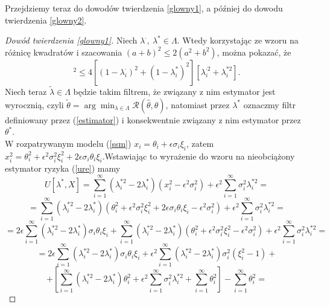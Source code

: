 \documentclass{mwart}
\begin{document}
Przejdziemy teraz do dowodów twierdzenia \ref{glowny1}, a później do dowodu twierdzenia \ref{glowny2}.
\begin{proof}[Dowód twierdzenia \ref{glowny1}]
Niech $\lambda^{\cdot},\ \lambda^*\in \Lambda$. Wtedy korzystając ze wzoru na różnicę kwadratów i szacowania $(a+b)^2\leq 2(a^2+b^2)$, można pokazać, że
\begin{displaymath}
[(1-\lambda_i^{\cdot})^2-(1-\lambda_i^*)^2]^2\leq 4[(1-\lambda_i^{\cdot})^2+(1-\lambda_i^*)^2][\lambda_i^{\cdot 2}+\lambda_i^{*2}].
\end{displaymath}
Niech teraz $\tilde{\lambda}\in \Lambda$ będzie takim filtrem, że związany z nim estymator jest wyrocznią, czyli $\tilde{\theta}=\arg \min_{\lambda\in \Lambda}\mathcal{R}(\hat{\theta},\theta)$, natomiast przez $\lambda^*$ oznaczmy filtr definiowany przez (\ref{estimator}) i konsekwentnie związany z nim estymator przez $\theta^*$.\\
W rozpatrywanym modelu (\ref{ssm}) $x_i=\theta_i+\epsilon\sigma_i\xi_i$, zatem $x_i^2=\theta_i^2+\epsilon^2\sigma_i^2\xi_i^2+2\epsilon\sigma_i\theta_i\xi_i$.Wstawiając to wyrażenie do wzoru na nieobciążony estymator ryzyka (\ref{ure}) mamy
\begin{displaymath}
U[\lambda^*,X]=\sum_{i=1}^{\infty}(\lambda_i^{*2}-2\lambda_i^*)(x_i^2-\epsilon^2\sigma_i^2)+\epsilon^2\sum_{i=1}^{\infty}\sigma_i^2\lambda_i^{*2}=
\end{displaymath}
\begin{displaymath}
=\sum_{i=1}^{\infty}(\lambda_i^{*2}-2\lambda_i^*)(\theta_i^2+\epsilon^2\sigma_i^2\xi_i^2+2\epsilon\sigma_i\theta_i\xi_i-\epsilon^2\sigma_i^2)+\epsilon^2\sum_{i=1}^{\infty}\sigma_i^2\lambda_i^{*2}=
\end{displaymath}
\begin{displaymath}
=2\epsilon\sum_{i=1}^{\infty}(\lambda_i^{*2}-2\lambda_i^*)\sigma_i\theta_i\xi_i+\sum_{i=1}^{\infty}(\lambda_i^{*2}-2\lambda_i^*)(\theta_i^2+\epsilon^2\sigma_i^2\xi_i^2-\epsilon^2\sigma_i^2)+\epsilon^2\sum_{i=1}^{\infty}\sigma_i^2\lambda_i^{*2}=
\end{displaymath}
\begin{displaymath}
=2\epsilon\sum_{i=1}^{\infty}(\lambda_i^{*2}-2\lambda_i^*)\sigma_i\theta_i\xi_i+\epsilon^2\sum_{i=1}^{\infty}(\lambda_i^{*2}-2\lambda_i^*)\sigma_i^2(\xi_i^2-1)+
\end{displaymath}
\begin{displaymath}
+\left[\sum_{i=1}^{\infty}(\lambda_i^{*2}-2\lambda_i^*)\theta_i^2+\epsilon^2\sum_{i=1}^{\infty}\sigma_i^2\lambda_i^{*2}+\sum_{i=1}^{\infty}\theta_i^2\right]-\sum_{i=1}^{\infty}\theta_i^2=

\end{displaymath}
\end{proof}
\end{document}

